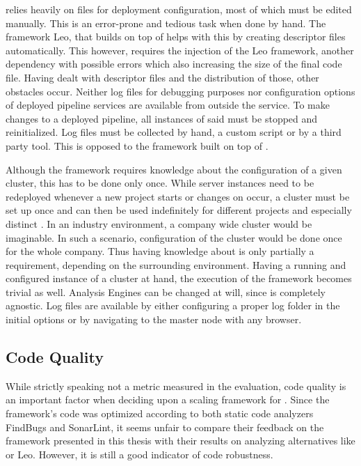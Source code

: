 \uimaas{} relies heavily on \xml{} files for deployment configuration, most of which must be edited manually. This is an error-prone and tedious task when done by hand. The framework Leo, that builds on top of \uimaas{} helps with this by creating \xml{} descriptor files automatically. This however, requires the injection of the Leo framework, another dependency with possible errors which also increasing the size of the final code file. Having dealt with \xml{} descriptor files and the distribution of those, other obstacles occur. Neither log files for debugging purposes nor configuration options of deployed pipeline services are available from outside the service. To make changes to a deployed pipeline, all instances of said \anen{} must be stopped and reinitialized. Log files must be collected by hand, a custom script or by a third party tool. This is opposed to the framework built on top of \spark{}.

Although the framework requires knowledge about the configuration of a given \spark{} cluster, this has to be done only once. While \uimaas{} server instances need to be redeployed whenever a new project starts or changes on \anens{} occur, a \spark{} cluster must be set up once and can then be used indefinitely for different projects and especially distinct \anens{}. In an industry environment, a company wide \spark{} cluster would be imaginable. In such a scenario, configuration of the \spark{} cluster would be done once for the whole company. Thus having knowledge about \spark{} is only partially a requirement, depending on the surrounding environment. Having a running and configured instance of a \spark{} cluster at hand, the execution of the framework becomes trivial as well. Analysis Engines can be changed at will, since \spark{} is completely \uima{} agnostic. Log files are available by either configuring a proper log folder in the initial \spark{} options or by navigating to the \spark{} master node with any browser.
\subsection{Code Quality}
While strictly speaking not a metric measured in the evaluation, code quality is an important factor when deciding upon a scaling framework for \uima{}. Since the framework's code was optimized according to both static code analyzers FindBugs and SonarLint, it seems unfair to compare their feedback on the framework presented in this thesis with their results on analyzing alternatives like \uimaas{} or Leo. However, it is still a good indicator of code robustness.

